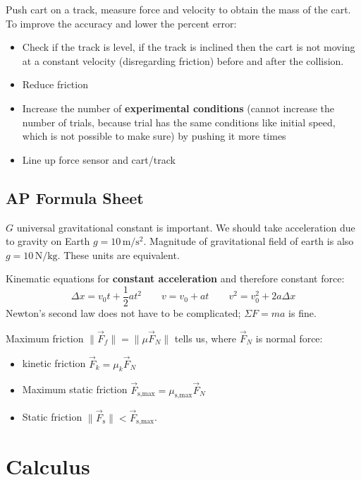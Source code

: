 \documentclass{article}
\begin{document}
Push cart on a track, measure force and velocity to obtain the mass of the cart. To improve the accuracy and lower the percent error:
\begin{itemize}
	\item Check if the track is level, if the track is inclined then the cart is not moving at a constant velocity (disregarding friction) before and after the collision.
	\item Reduce friction
	\item Increase the number of \textbf{experimental conditions} (cannot increase the number of trials, because trial has the same conditions like initial speed, which is not possible to make sure) by pushing it more times
	\item Line up force sensor and cart/track
\end{itemize}

\subsection{AP Formula Sheet}

$G$ universal gravitational constant is important. We should take acceleration due to gravity on Earth $g=10\,\si{\meter\per\second\squared}$. Magnitude of gravitational field of earth is also $g=10\,\si{\newton\per\kilo\gram}$. These units are equivalent.

Kinematic equations for \textbf{constant acceleration} and therefore constant force:
\begin{equation*}
    \Delta x=v_0t+\frac12at^2 \qquad
	v=v_0+at \qquad
	v^2=v_0^2+2a\Delta x
\end{equation*}
Newton's second law does not have to be complicated; $\Sigma F=ma$ is fine.

Maximum friction $\lVert \vec{F}_f \rVert =\lVert \mu \vec{F}_N \rVert $ tells us, where $\vec{F}_N$ is normal force:
\begin{itemize}
	\item kinetic friction $\vec{F}_k=\mu_k \vec{F}_N$
	\item Maximum static friction $\vec{F}_\text{s,max}=\mu_\text{s,max}\vec{F}_N$
	\item Static friction $\lVert \vec{F}_\text{s} \rVert <\vec{F}_\text{s,max}$.
\end{itemize}

\section{Calculus}
\label{sec:calculus}
\end{document}
